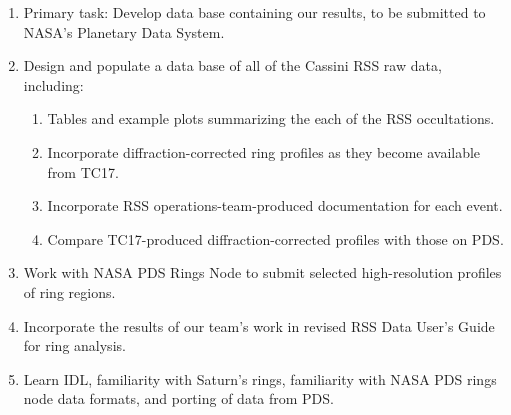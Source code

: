 \documentclass[crop=false,class=article,oneside]{standalone}
\begin{document}
            \begin{enumerate}
                \item Primary task: Develop data base containing our
                      results, to be submitted to NASA's Planetary
                      Data System.
                \item Design and populate a data base of all of
                      the Cassini RSS raw data, including:
                    \begin{enumerate}
                        \item Tables and example plots summarizing
                              the each of the RSS occultations.
                        \item Incorporate diffraction-corrected ring
                              profiles as they become available from TC17.
                        \item Incorporate RSS operations-team-produced
                              documentation for each event.
                        \item Compare TC17-produced diffraction-corrected
                              profiles with those on PDS.
                    \end{enumerate}
                \item Work with NASA PDS Rings Node to submit selected
                      high-resolution profiles of ring regions.
                \item Incorporate the results of our team's work in
                      revised RSS Data User's Guide for ring analysis.
                \item Learn IDL, familiarity with Saturn's rings,
                      familiarity with NASA PDS rings node data formats,
                      and porting of data from PDS.
            \end{enumerate}
\end{document}
